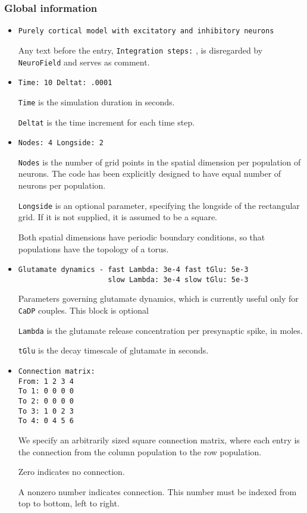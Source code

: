 \documentclass[12pt,a4paper]{article}
\newcommand{\type}[1]{ {\small\small\tt #1} }
\newcommand{\NF}[0]{ \type{NeuroField}}
\begin{document}
\subsubsection{Global information}
\label{sec:global}
\begin{itemize}

\item
\begin{lstlisting}
Purely cortical model with excitatory and inhibitory neurons
\end{lstlisting}
Any text before the entry, \type{Integration steps:}, is disregarded by \NF and serves as comment.
\item
\begin{lstlisting}
Time: 10 Deltat: .0001 
\end{lstlisting}
\type{Time} is the simulation duration in seconds.

\type{Deltat} is the time increment for each time step.
\item
\begin{lstlisting}
Nodes: 4 Longside: 2
\end{lstlisting}
\type{Nodes} is the number of grid points in the spatial dimension per population of neurons. The code has been explicitly designed to have equal number of neurons per population.

\type{Longside} is an optional parameter, specifying the longside of the rectangular grid. If it is not supplied, it is assumed to be a square.

Both spatial dimensions have periodic boundary conditions, so that populations have the topology of a torus.
\item
\begin{lstlisting}
Glutamate dynamics - fast Lambda: 3e-4 fast tGlu: 5e-3
                     slow Lambda: 3e-4 slow tGlu: 5e-3
\end{lstlisting}
Parameters governing glutamate dynamics, which is currently useful only for \type{CaDP} couples. This block is optional

\type{Lambda} is the glutamate release concentration per presynaptic spike, in moles.

\type{tGlu} is the decay timescale of glutamate in seconds.
\item
\begin{lstlisting}
Connection matrix:
From: 1 2 3 4
To 1: 0 0 0 0
To 2: 0 0 0 0
To 3: 1 0 2 3
To 4: 0 4 5 6
\end{lstlisting}
We specify an arbitrarily sized square connection matrix, where each entry is the connection from the column population to the row population.

Zero indicates no connection.

A nonzero number indicates connection. This number must be indexed from top to bottom, left to right.
\end{itemize}
\end{document}
